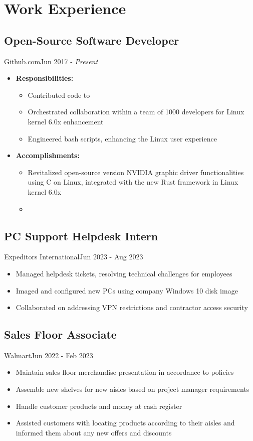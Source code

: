 \section{Work Experience}
\subsection{Open-Source Software Developer}{Github.com}{Jun 2017 - \textit{Present}}
\begin{itemize}
    \item \textbf{Responsibilities:}
  \begin{itemize}
  \item Contributed code to   
  \item Orchestrated collaboration within a team of 1000 developers for Linux kernel 6.0x enhancement
  \item Engineered bash scripts, enhancing the Linux user experience
  \end{itemize}
  \item{\textbf{Accomplishments:}}
  \begin{itemize}
  \item Revitalized open-source version NVIDIA graphic driver functionalities using C on Linux, integrated with the new Rust framework in Linux kernel 6.0x
  \item  
  \end{itemize}
\end{itemize}
\subsection{PC Support Helpdesk Intern}{Expeditors International}{Jun 2023 - Aug 2023}
\begin{itemize}
    \item Managed helpdesk tickets, resolving technical challenges for employees
    \item Imaged and configured new PCs using company Windows 10 disk image
    \item Collaborated on addressing VPN restrictions and contractor access security
\end{itemize}
\subsection{Sales Floor Associate}{Walmart}{Jun 2022 - Feb 2023}
\begin{itemize}
    \item Maintain sales floor merchandise presentation in accordance to policies
    \item Assemble new shelves for new aisles based on project manager requirements
    \item Handle customer products and money at cash register
    \item Assisted customers with locating products according to their aisles and informed them about any new offers and discounts 
\end{itemize}
